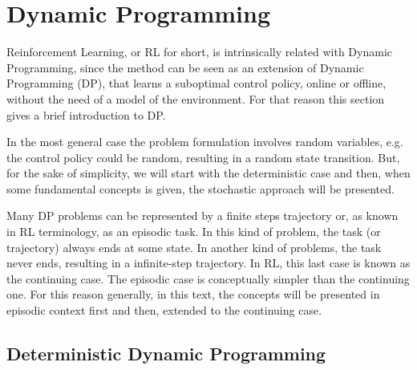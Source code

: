 \section{Dynamic Programming} 
\label{sec:DP}

Reinforcement Learning,  or RL for short, is intrinsically related with Dynamic Programming, since the method can be seen as an extension of  Dynamic Programming (DP), that learns a suboptimal control policy, online or offline, without the need of a model of the environment.  
For that reason this section gives a brief introduction to DP.

In the most general case the problem formulation involves random variables, e.g. the control policy could be random, resulting in a random state transition. But, for the sake of simplicity, we will start with the deterministic case and then, when some fundamental concepts is given, the stochastic approach will be presented. 

Many DP problems can be represented by a finite steps trajectory or, as known in RL terminology, as an episodic task. In this kind of problem, the task (or trajectory) always ends at some state. In another kind of problems, the task never ends, resulting in a infinite-step trajectory. In RL, this last case is known as the continuing case. The episodic case is conceptually simpler than the continuing one. For this reason generally, in this text, the concepts will be presented in episodic context first and then, extended to the continuing case. 

\subsection{Deterministic Dynamic Programming}

